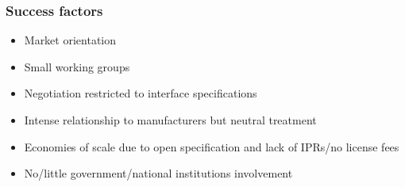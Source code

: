 \begin{frame}
  \frametitle{Success factors}
  
  \begin{itemize}
   \item Market orientation 
   \item Small working groups
   \item Negotiation restricted to interface specifications
   \item Intense relationship to manufacturers but neutral treatment
   \item Economies of scale due to open specification and lack of IPRs/no license fees 
   \item No/little government/national institutions involvement
  \end{itemize}
\end{frame}